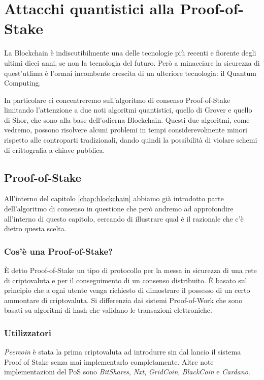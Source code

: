 \chapter{Attacchi quantistici alla Proof-of-Stake}
La Blockchain è indiscutibilmente una delle tecnologie più recenti e fiorente degli ultimi dieci anni, se non la tecnologia del futuro. Però a minacciare la sicurezza di quest'utlima è l'ormai incombente crescita di un ulteriore tecnologia: il Quantum Computing.

In particolare ci concentreremo sull'algoritmo di consenso Proof-of-Stake limitando l'attenzione a due noti algoritmi quantistici, quello di Grover e quello di Shor, che sono alla base dell'odierna Blockchain. Questi due algoritmi, come vedremo, possono risolvere alcuni problemi in tempi considerevolmente minori rispetto alle controparti tradizionali, dando quindi la possibilità di violare schemi di crittografia a chiave pubblica.

\section{Proof-of-Stake}
All'interno del capitolo \ref{chap:blockchain} abbiamo già introdotto parte dell'algoritmo di consenso in questione che però andremo ad approfondire all'interno di questo capitolo, cercando di illustrare qual è il razionale che c'è dietro questa scelta.

\subsection{Cos'è una Proof-of-Stake?}
È detto Proof-of-Stake un tipo di protocollo per la messa in sicurezza di una rete di criptovaluta e per il conseguimento di un consenso distribuito. È basato sul principio che a ogni utente venga richiesto di dimostrare il possesso di un certo ammontare di criptovaluta. Si differenzia dai sistemi Proof-of-Work che sono basati su algoritmi di hash che validano le transazioni elettroniche.

\subsection{Utilizzatori}
\textit{Peercoin} è stata la prima criptovaluta ad introdurre sin dal lancio il sistema Proof of Stake senza mai implementarlo completamente. Altre note implementazioni del PoS sono \textit{BitShares}, \textit{Nxt}, \textit{GridCoin}, \textit{BlackCoin} e \textit{Cardano}.

